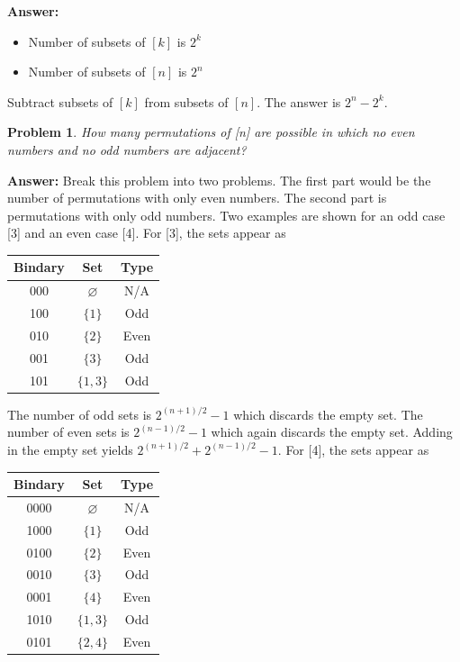 \documentclass{article}
\theoremstyle{plain}
\newtheorem{problem}{Problem}
\begin{document}
\textbf{Answer:}
\begin{itemize}
    \item Number of subsets of $[k]$ is $2^k$
    \item Number of subsets of $[n]$ is $2^n$
\end{itemize}
Subtract subsets of $[k]$ from subsets of $[n]$. The answer is $2^{n} - 2^{k}$.

\setcounter{problem}{9}
\begin{problem} %
    How many permutations of [n] are possible in which no even numbers and no odd numbers are adjacent?
\end{problem}

\textbf{Answer:}
Break this problem into two problems. The first part would be the number of permutations with only even numbers. The second part is permutations with only odd numbers. Two examples are shown for an odd case [3] and an even case [4]. For [3], the sets appear as

\begin{center}
\begin{tabular}{c|c|c}
    Bindary & Set & Type \\
    \hline
    000 & $\varnothing$ & N/A \\
    100 & $\{1\}$ & Odd \\
    010 & $\{2\}$ & Even \\
    001 & $\{3\}$ & Odd \\
    101 & $\{1,3\}$ & Odd
\end{tabular}
\end{center}

The number of odd sets is $2^{(n+1)/2}-1$ which discards the empty set. The number of even sets is $2^{(n-1)/2}-1$ which again discards the empty set. Adding in the empty set yields $2^{(n+1)/2} + 2^{(n-1)/2} - 1$. For [4], the sets appear as

\begin{center}
\begin{tabular}{c|c|c}
    Bindary & Set & Type \\
    \hline
    0000 & $\varnothing$ & N/A \\
    1000 & $\{1\}$ & Odd \\
    0100 & $\{2\}$ & Even \\
    0010 & $\{3\}$ & Odd \\
    0001 & $\{4\}$ & Even \\
    1010 & $\{1,3\}$ & Odd \\
    0101 & $\{2,4\}$ & Even
\end{tabular}
\end{center}
\end{document}
